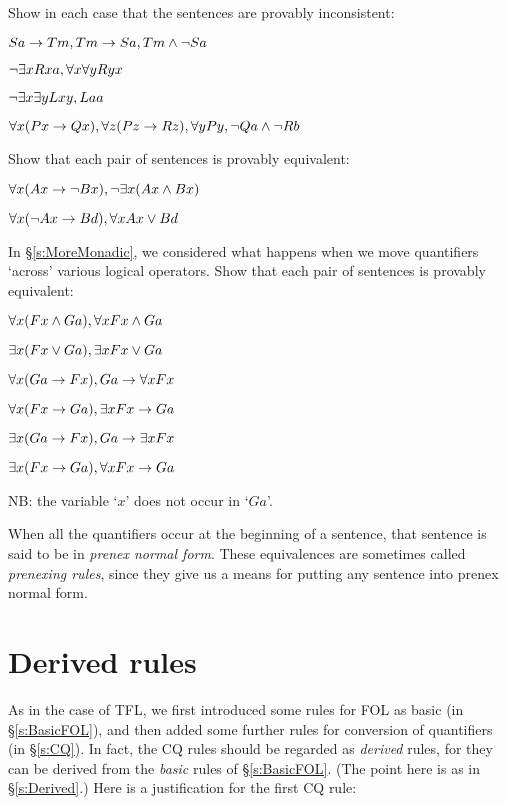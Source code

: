 \begin{practiceproblems}
\problempart
Show in each case that the sentences are provably inconsistent:
\begin{earg}
\item $Sa\rightarrow Tm, Tm \rightarrow Sa, Tm \mathbin{\wedge} \neg Sa$
\item $\neg\exists x Rxa, \forall x \forall y Ryx$
\item $\neg\exists x \exists y Lxy, Laa$
\item $\forall x(Px \rightarrow Qx), \forall z(Pz \rightarrow Rz), \forall y Py, \neg Qa \mathbin{\wedge} \neg Rb$
\end{earg}

\problempart
Show that each pair of sentences is provably equivalent:
\begin{earg}
\item $\forall x (Ax\rightarrow \neg Bx), \neg\exists x(Ax \mathbin{\wedge} Bx)$
\item $\forall x (\neg Ax\rightarrow Bd), \forall x Ax \vee Bd$
\end{earg}

\problempart
In \S\ref{s:MoreMonadic}, we considered what happens when we move quantifiers `across' various logical operators. Show that each pair of sentences is provably equivalent:
\begin{earg}
\item $\forall x (Fx \mathbin{\wedge} Ga), \forall x Fx \mathbin{\wedge} Ga$
\item $\exists x (Fx \vee Ga), \exists x Fx \vee Ga$
\item $\forall x(Ga \rightarrow Fx), Ga \rightarrow \forall x Fx$
\item $\forall x(Fx \rightarrow Ga), \exists x Fx \rightarrow Ga$
\item $\exists x(Ga \rightarrow Fx), Ga \rightarrow \exists x Fx$
\item $\exists x(Fx \rightarrow Ga), \forall x Fx \rightarrow Ga$
\end{earg}
NB: the variable `$x$' does not occur in `$Ga$'.

When all the quantifiers occur at the beginning of a sentence, that sentence is said to be in \emph{prenex normal form}. These equivalences are sometimes called \emph{prenexing rules}, since they give us a means for putting any sentence into prenex normal form.



\end{practiceproblems}


\chapter{Derived rules}\label{s:DerivedFOL}
As in the case of TFL, we first introduced some rules for FOL as basic (in \S\ref{s:BasicFOL}), and then added some further rules for conversion of quantifiers (in \S\ref{s:CQ}). In fact, the CQ rules should be regarded as \emph{derived} rules, for they can be derived from the  \emph{basic} rules of \S\ref{s:BasicFOL}. (The point here is as in \S\ref{s:Derived}.) Here is a justification for the first CQ rule:

